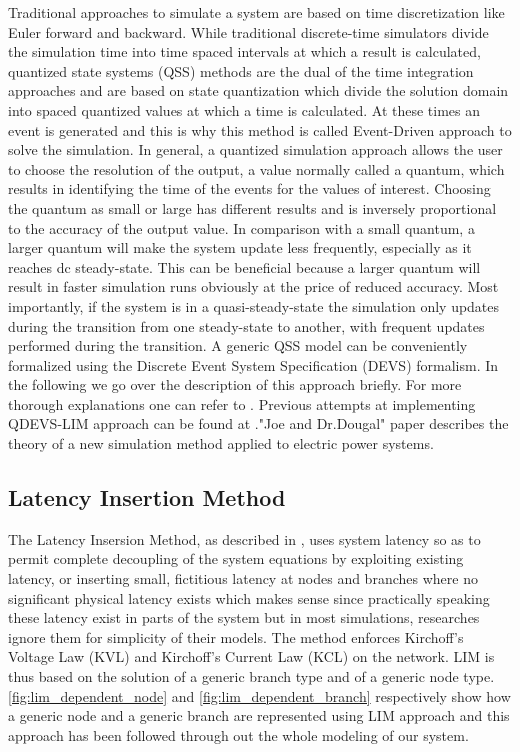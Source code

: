 \documentclass{scspaperproc}
\theoremstyle{scsthe}
\begin{document}
Traditional approaches to simulate a system are based on time discretization like Euler forward and backward. While traditional discrete-time simulators divide the simulation time into time spaced intervals at which a result is calculated, quantized state systems (QSS) methods are the dual of the time integration approaches and are based on state quantization which divide the solution domain into spaced quantized values at which a time is calculated. At these times an event is generated and this is why this method is called Event-Driven approach to solve the simulation. In general, a quantized simulation approach allows the user to choose the resolution of the output, a value normally called a quantum, which results in identifying the time of the events for the values of interest. Choosing the quantum as small or large has different results and is inversely proportional to the accuracy of the output value. In comparison with a small quantum, a larger quantum will make the system update less frequently, especially as it reaches dc steady-state. This can be beneficial because a larger quantum will result in faster simulation runs obviously at the price of reduced accuracy. Most importantly, if the system is in a quasi-steady-state the simulation only updates during the transition from one steady-state to another, with frequent updates performed during the transition. A generic QSS model can be conveniently formalized using the Discrete Event System Specification (DEVS) formalism. In the following we go over the description of this approach briefly. For more thorough explanations one can refer to  \cite{cellier2006continuous}. Previous attempts at implementing QDEVS-LIM approach can be found at  \cite{benigni1}."Joe and Dr.Dougal" paper describes the theory of a new simulation method applied to electric power systems.

\subsection{Latency Insertion Method} 

The Latency Insersion Method, as described in \cite{schutt1}, uses system latency so as to permit complete decoupling of the system equations by exploiting existing latency, or inserting small, fictitious latency at nodes and branches where no significant physical latency exists which makes sense since practically speaking these latency exist in parts of the system but in most simulations, researches ignore them for simplicity of their models. The method enforces  Kirchoff's Voltage Law (KVL) and Kirchoff's Current Law (KCL) on the network. LIM is thus based on the solution of a generic branch type and of a generic node type. \autoref{fig:lim_dependent_node} and \autoref{fig:lim_dependent_branch} respectively show how a generic node and a generic branch are represented using LIM approach and this approach has been followed through out the whole modeling of our system. 
\end{document}
